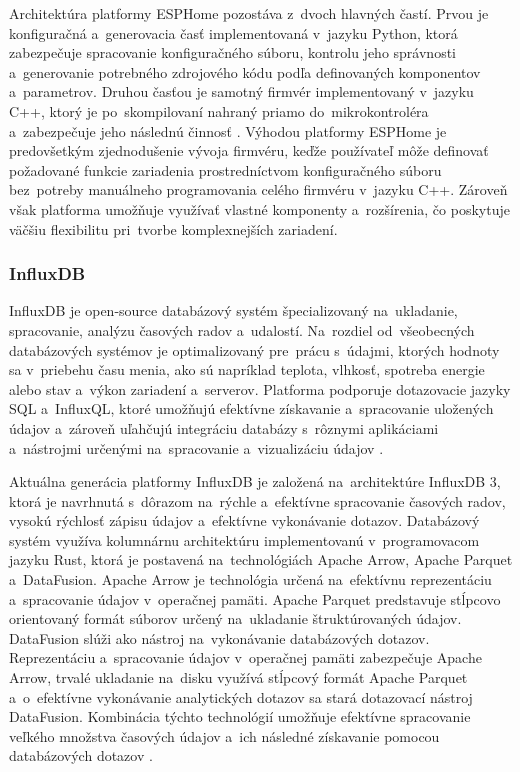 Architektúra platformy ESPHome pozostáva z~dvoch hlavných častí. 
Prvou je konfiguračná a~generovacia časť implementovaná v~jazyku Python, 
ktorá zabezpečuje spracovanie konfiguračného súboru, kontrolu jeho 
správnosti a~generovanie potrebného zdrojového kódu podľa definovaných 
komponentov a~parametrov. Druhou časťou je samotný firmvér 
implementovaný v~jazyku C++, ktorý je po~skompilovaní nahraný priamo 
do~mikrokontroléra a~zabezpečuje jeho následnú činnosť
\cite{architektura_esphome}. 
Výhodou platformy ESPHome je predovšetkým zjednodušenie vývoja firmvéru, 
keďže používateľ môže definovať požadované funkcie zariadenia 
prostredníctvom konfiguračného súboru bez~potreby manuálneho 
programovania celého firmvéru v~jazyku C++. Zároveň však 
platforma umožňuje využívať vlastné komponenty a~rozšírenia, čo 
poskytuje väčšiu flexibilitu pri~tvorbe komplexnejších zariadení.

\subsubsection{InfluxDB}
InfluxDB je open-source databázový systém špecializovaný na~ukladanie, spracovanie, 
analýzu časových radov a~udalostí. Na~rozdiel od~všeobecných databázových 
systémov je optimalizovaný pre~prácu s~údajmi, ktorých hodnoty sa v~priebehu 
času menia, ako sú napríklad teplota, vlhkosť, spotreba energie alebo stav a~výkon 
zariadení a~serverov. Platforma podporuje dotazovacie jazyky SQL a~InfluxQL, 
ktoré umožňujú efektívne získavanie a~spracovanie uložených údajov a~zároveň 
uľahčujú integráciu databázy s~rôznymi aplikáciami a~nástrojmi určenými 
na~spracovanie a~vizualizáciu údajov \cite{influxdb}.

Aktuálna generácia platformy InfluxDB je založená na~architektúre InfluxDB 3, 
ktorá je navrhnutá s~dôrazom na~rýchle a~efektívne spracovanie časových radov, 
vysokú rýchlosť zápisu údajov a~efektívne vykonávanie dotazov. Databázový systém 
využíva kolumnárnu architektúru implementovanú v~programovacom jazyku Rust, ktorá 
je postavená na~technológiách Apache Arrow, Apache Parquet a~DataFusion. 
Apache Arrow je technológia určená na~efektívnu reprezentáciu a~spracovanie 
údajov v~operačnej pamäti. Apache Parquet predstavuje stĺpcovo orientovaný formát 
súborov určený na~ukladanie štruktúrovaných údajov. 
DataFusion slúži ako nástroj na~vykonávanie databázových dotazov. Reprezentáciu 
a~spracovanie údajov v~operačnej pamäti zabezpečuje Apache Arrow, trvalé ukladanie 
na~disku využívá stĺpcový formát Apache Parquet a~o~efektívne vykonávanie analytických 
dotazov sa stará dotazovací nástroj DataFusion. Kombinácia týchto technológií umožňuje 
efektívne spracovanie veľkého množstva časových údajov a~ich následné 
získavanie pomocou databázových dotazov \cite{architektura_influxdb}.

